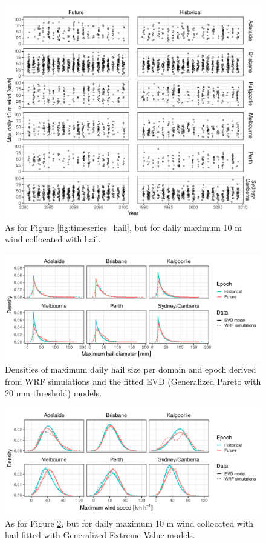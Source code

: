 \documentclass[draft,grl]{agutexSI2019}\usepackage[]{graphicx}\usepackage[]{xcolor}
\begin{document}
\begin{article}
\begin{figure}[!ht]
    \includegraphics[width=\textwidth]{figures/timeseries_wind}
    \caption{As for Figure \ref{fig:timeseries_hail}, but for daily maximum 10 m wind collocated with hail.}
    \label{fig:timeseries_wind}
\end{figure}

\begin{figure}[!ht]
    \includegraphics[width=\textwidth]{figures/gev_dists_hail}
    \caption{Densities of maximum daily hail size per domain and epoch derived from WRF simulations and the fitted EVD (Generalized Pareto with 20 mm threshold) models.}
    \label{fig:densities_hail}
\end{figure}

\begin{figure}[!ht]
    \includegraphics[width=\textwidth]{figures/gev_dists_wind}
    \caption{As for Figure \ref{fig:densities_hail}, but for daily maximum 10 m wind collocated with hail fitted with Generalized Extreme Value models.}
    \label{fig:densities_wind}
\end{figure}


\end{article}
\end{document}

